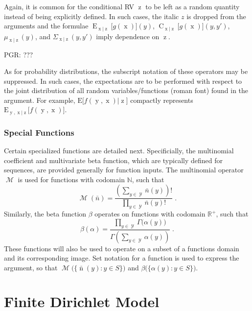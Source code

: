 \documentclass[12pt]{report}
\DeclareMathOperator{\xrm}{\mathrm{x}}
\DeclareMathOperator{\yrm}{\mathrm{y}}
\DeclareMathOperator{\nrm}{\mathrm{n}}
\DeclareMathOperator{\zrm}{\mathrm{z}}
\DeclareMathOperator{\Erm}{\mathrm{E}}
\DeclareMathOperator{\Crm}{\mathrm{C}}
\DeclareMathOperator{\Ycal}{\mathcal{Y}}
\DeclareMathOperator{\Mcal}{\mathcal{M}}
\begin{document}
Again, it is common for the conditional RV $\zrm$ to be left as a random quantity instead of being explicitly defined. In such cases, the italic $z$ is dropped from the arguments and the formulae $\Erm_{\xrm|\zrm}\big[ g(\xrm) \big](y)$, $\Crm_{\xrm|\zrm}\big[g(\xrm)\big](y,y')$, $\mu_{\xrm|\zrm}(y)$, and $\Sigma_{\xrm|\zrm}(y,y')$ imply dependence on $\zrm$.

PGR: ???

As for probability distributions, the subscript notation of these operators may be suppressed. In such cases, the expectations are to be performed with respect to the joint distribution of all random variables/functions (roman font) found in the argument. For example, $\text{E}\big[f(\yrm,\xrm) | \zrm \big]$ compactly represents $\text{E}_{\yrm,\xrm | \zrm}\big[f(\yrm,\xrm)\big]$.


\subsection{Special Functions}

Certain specialized functions are detailed next. Specificially, the multinomial coefficient and multivariate beta function, which are typically defined for sequences, are provided generally for function inputs. The multinomial operator $\Mcal$ is used for functions with codomain $\mathbb{N}$, such that 
\begin{equation}
\Mcal(\bar{n}) = \frac{\left( \sum_{y \in \Ycal} \bar{n}(y) \right)!}{\prod_{y \in \Ycal} \bar{n}(y)!} \;.
\end{equation}
Similarly, the beta function $\beta$ operates on functions with codomain $\mathbb{R}^+$, such that
\begin{equation}
\beta(\alpha) = \frac{\prod_{y \in \Ycal} \Gamma\big( \alpha(y) \big)}{\Gamma \left( \sum_{y \in \Ycal} \alpha(y) \right)} \;.
\end{equation}
These functions will also be used to operate on a subset of a functions domain and its corresponding image. Set notation for a function is used to express the argument, so that $\Mcal\Big( \big\{ \bar{\nrm}(y) : y \in S \big\} \Big)$ and $\beta\Big( \big\{ \alpha(y) : y \in S \big\} \Big)$.













\chapter{Finite Dirichlet Model}
\end{document}
